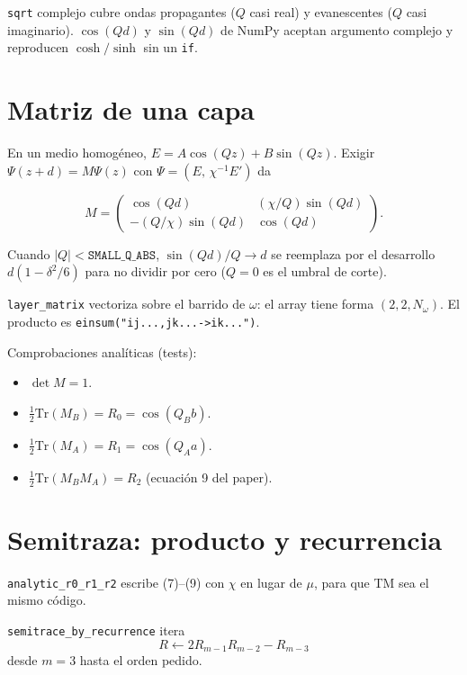 \documentclass[11pt,a4paper]{article}
\begin{document}
\texttt{sqrt} complejo cubre ondas propagantes (\(Q\) casi real) y evanescentes
(\(Q\) casi imaginario). \(\cos(Qd)\) y \(\sin(Qd)\) de NumPy aceptan argumento
complejo y reproducen \(\cosh/\sinh\) sin un \texttt{if}.

\section{Matriz de una capa}

En un medio homogéneo, \(E=A\cos(Qz)+B\sin(Qz)\). Exigir
\(\Psi(z+d)=M\Psi(z)\) con \(\Psi=(E,\,\chi^{-1}E')\) da

\begin{equation}
M=\begin{pmatrix}
\cos(Qd) & (\chi/Q)\sin(Qd)\\
-(Q/\chi)\sin(Qd) & \cos(Qd)
\end{pmatrix}.
\end{equation}

Cuando \(\lvert Q\rvert<\texttt{SMALL\_Q\_ABS}\), \(\sin(Qd)/Q\to d\) se
reemplaza por el desarrollo \(d(1-\delta^2/6)\) para no dividir por cero
(\(Q=0\) es el umbral de corte).

\texttt{layer\_matrix} vectoriza sobre el barrido de \(\omega\): el array
tiene forma \((2,2,N_\omega)\). El producto es
\texttt{einsum("ij...,jk...->ik...")}.

Comprobaciones analíticas (tests):

\begin{itemize}
\item \(\det M=1\).
\item \(\frac12\mathrm{Tr}(M_B)=R_0=\cos(Q_B b)\).
\item \(\frac12\mathrm{Tr}(M_A)=R_1=\cos(Q_A a)\).
\item \(\frac12\mathrm{Tr}(M_B M_A)=R_2\) (ecuación 9 del paper).
\end{itemize}

\section{Semitraza: producto y recurrencia}

\texttt{analytic\_r0\_r1\_r2} escribe (7)--(9) con \(\chi\) en lugar de \(\mu\),
para que TM sea el mismo código.

\texttt{semitrace\_by\_recurrence} itera
\begin{equation}
R \leftarrow 2 R_{m-1} R_{m-2}-R_{m-3}
\end{equation}
desde \(m=3\) hasta el orden pedido.
\end{document}
